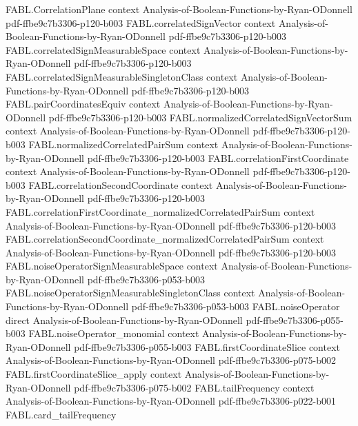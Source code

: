 \begin{theorem}
\proofstep
  {FABL.CorrelationPlane}
  {context}
  {Analysis-of-Boolean-Functions-by-Ryan-ODonnell}
  {pdf-ffbe9c7b3306-p120-b003}
\proofstep
  {FABL.correlatedSignVector}
  {context}
  {Analysis-of-Boolean-Functions-by-Ryan-ODonnell}
  {pdf-ffbe9c7b3306-p120-b003}
\proofstep
  {FABL.correlatedSignMeasurableSpace}
  {context}
  {Analysis-of-Boolean-Functions-by-Ryan-ODonnell}
  {pdf-ffbe9c7b3306-p120-b003}
\proofstep
  {FABL.correlatedSignMeasurableSingletonClass}
  {context}
  {Analysis-of-Boolean-Functions-by-Ryan-ODonnell}
  {pdf-ffbe9c7b3306-p120-b003}
\proofstep
  {FABL.pairCoordinatesEquiv}
  {context}
  {Analysis-of-Boolean-Functions-by-Ryan-ODonnell}
  {pdf-ffbe9c7b3306-p120-b003}
\proofstep
  {FABL.normalizedCorrelatedSignVectorSum}
  {context}
  {Analysis-of-Boolean-Functions-by-Ryan-ODonnell}
  {pdf-ffbe9c7b3306-p120-b003}
\proofstep
  {FABL.normalizedCorrelatedPairSum}
  {context}
  {Analysis-of-Boolean-Functions-by-Ryan-ODonnell}
  {pdf-ffbe9c7b3306-p120-b003}
\proofstep
  {FABL.correlationFirstCoordinate}
  {context}
  {Analysis-of-Boolean-Functions-by-Ryan-ODonnell}
  {pdf-ffbe9c7b3306-p120-b003}
\proofstep
  {FABL.correlationSecondCoordinate}
  {context}
  {Analysis-of-Boolean-Functions-by-Ryan-ODonnell}
  {pdf-ffbe9c7b3306-p120-b003}
\proofstep
  {FABL.correlationFirstCoordinate_normalizedCorrelatedPairSum}
  {context}
  {Analysis-of-Boolean-Functions-by-Ryan-ODonnell}
  {pdf-ffbe9c7b3306-p120-b003}
\proofstep
  {FABL.correlationSecondCoordinate_normalizedCorrelatedPairSum}
  {context}
  {Analysis-of-Boolean-Functions-by-Ryan-ODonnell}
  {pdf-ffbe9c7b3306-p120-b003}
\proofstep
  {FABL.noiseOperatorSignMeasurableSpace}
  {context}
  {Analysis-of-Boolean-Functions-by-Ryan-ODonnell}
  {pdf-ffbe9c7b3306-p053-b003}
\proofstep
  {FABL.noiseOperatorSignMeasurableSingletonClass}
  {context}
  {Analysis-of-Boolean-Functions-by-Ryan-ODonnell}
  {pdf-ffbe9c7b3306-p053-b003}
\proofstep
  {FABL.noiseOperator}
  {direct}
  {Analysis-of-Boolean-Functions-by-Ryan-ODonnell}
  {pdf-ffbe9c7b3306-p055-b003}
\proofstep
  {FABL.noiseOperator_monomial}
  {context}
  {Analysis-of-Boolean-Functions-by-Ryan-ODonnell}
  {pdf-ffbe9c7b3306-p055-b003}
\proofstep
  {FABL.firstCoordinateSlice}
  {context}
  {Analysis-of-Boolean-Functions-by-Ryan-ODonnell}
  {pdf-ffbe9c7b3306-p075-b002}
\proofstep
  {FABL.firstCoordinateSlice_apply}
  {context}
  {Analysis-of-Boolean-Functions-by-Ryan-ODonnell}
  {pdf-ffbe9c7b3306-p075-b002}
\proofstep
  {FABL.tailFrequency}
  {context}
  {Analysis-of-Boolean-Functions-by-Ryan-ODonnell}
  {pdf-ffbe9c7b3306-p022-b001}
\proofstep
  {FABL.card_tailFrequency}

\end{theorem}
